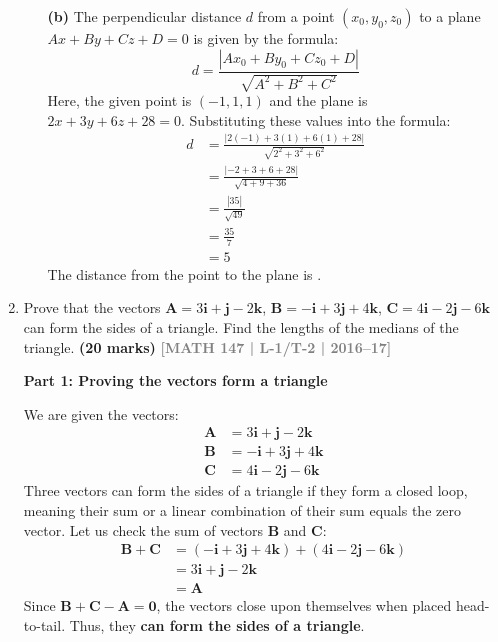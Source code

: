 \documentclass[12pt,a4paper]{article}
\newcommand{\yr}[1]{\hfill\textcolor{gray}{\small\textbf{[#1]}}}
\newcommand{\mk}[1]{\textcolor{orange!70!black}{\small\textbf{(#1 marks)}}}
\begin{document}
\begin{enumerate}
\begin{tcolorbox}[enhanced,breakable,ansbox,colback=cD!4,colframe=cD,boxrule=0.8pt,arc=5pt,title={\textbf{Answer}},fonttitle=\bfseries\color{white},colbacktitle=cD]
\begin{enumerate}
    \vspace{1.5em}
    \item[\textbf{(b)}] The perpendicular distance $d$ from a point $(x_0, y_0, z_0)$ to a plane $Ax + By + Cz + D = 0$ is given by the formula:
    \[ d = \frac{|Ax_0 + By_0 + Cz_0 + D|}{\sqrt{A^2 + B^2 + C^2}} \]
    Here, the given point is $(-1, 1, 1)$ and the plane is $2x + 3y + 6z + 28 = 0$. Substituting these values into the formula:
    \begin{align*}
        d &= \frac{|2(-1) + 3(1) + 6(1) + 28|}{\sqrt{2^2 + 3^2 + 6^2}} \\[1em]
        &= \frac{|-2 + 3 + 6 + 28|}{\sqrt{4 + 9 + 36}} \\[1em]
        &= \frac{|35|}{\sqrt{49}} \\[1em]
        &= \frac{35}{7} \\
        &= 5
    \end{align*}
    The distance from the point to the plane is .
\end{enumerate}

\end{tcolorbox}

\item Prove that the vectors $\mathbf{A}=3\mathbf{i}+\mathbf{j}-2\mathbf{k}$, $\mathbf{B}=-\mathbf{i}+3\mathbf{j}+4\mathbf{k}$, $\mathbf{C}=4\mathbf{i}-2\mathbf{j}-6\mathbf{k}$ can form the sides of a triangle. Find the lengths of the medians of the triangle.
\mk{20} \yr{MATH 147 | L-1/T-2 | 2016--17}

\begin{tcolorbox}[enhanced,breakable,ansbox,colback=cD!4,colframe=cD,boxrule=0.8pt,arc=5pt,title={\textbf{Answer}},fonttitle=\bfseries\color{white},colbacktitle=cD]

\textbf{Part 1: Proving the vectors form a triangle}

We are given the vectors:
\begin{align*}
    \mathbf{A} &= 3\mathbf{i} + \mathbf{j} - 2\mathbf{k} \\
    \mathbf{B} &= -\mathbf{i} + 3\mathbf{j} + 4\mathbf{k} \\
    \mathbf{C} &= 4\mathbf{i} - 2\mathbf{j} - 6\mathbf{k}
\end{align*}
Three vectors can form the sides of a triangle if they form a closed loop, meaning their sum or a linear combination of their sum equals the zero vector. Let us check the sum of vectors $\mathbf{B}$ and $\mathbf{C}$:
\begin{align*}
    \mathbf{B} + \mathbf{C} &= (-\mathbf{i} + 3\mathbf{j} + 4\mathbf{k}) + (4\mathbf{i} - 2\mathbf{j} - 6\mathbf{k}) \\
    &= 3\mathbf{i} + \mathbf{j} - 2\mathbf{k} \\
    &= \mathbf{A}
\end{align*}
Since $\mathbf{B} + \mathbf{C} - \mathbf{A} = \mathbf{0}$, the vectors close upon themselves when placed head-to-tail. Thus, they \textbf{can form the sides of a triangle}.


\end{tcolorbox}
\end{enumerate}
\end{document}

